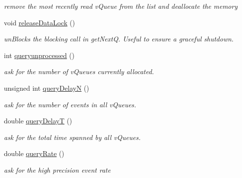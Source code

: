 \begin{DoxyCompactItemize}
\begin{DoxyCompactList}\small\item\em remove the most recently read v\+Queue from the list and deallocate the memory \end{DoxyCompactList}\item 
void \hyperlink{classev_1_1queueAllocator_aa3ab79f1da7f2930811ab980347b0305}{release\+Data\+Lock} ()\hypertarget{classev_1_1queueAllocator_aa3ab79f1da7f2930811ab980347b0305}{}\label{classev_1_1queueAllocator_aa3ab79f1da7f2930811ab980347b0305}

\begin{DoxyCompactList}\small\item\em un\+Blocks the blocking call in get\+NextQ. Useful to ensure a graceful shutdown. \end{DoxyCompactList}\item 
int \hyperlink{classev_1_1queueAllocator_adb785d0d33ba16522f8846da35c7ebab}{queryunprocessed} ()\hypertarget{classev_1_1queueAllocator_adb785d0d33ba16522f8846da35c7ebab}{}\label{classev_1_1queueAllocator_adb785d0d33ba16522f8846da35c7ebab}

\begin{DoxyCompactList}\small\item\em ask for the number of v\+Queues currently allocated. \end{DoxyCompactList}\item 
unsigned int \hyperlink{classev_1_1queueAllocator_a557861a4f3730b4d8da7895173c6986a}{query\+DelayN} ()\hypertarget{classev_1_1queueAllocator_a557861a4f3730b4d8da7895173c6986a}{}\label{classev_1_1queueAllocator_a557861a4f3730b4d8da7895173c6986a}

\begin{DoxyCompactList}\small\item\em ask for the number of events in all v\+Queues. \end{DoxyCompactList}\item 
double \hyperlink{classev_1_1queueAllocator_a439a2729d5474986977e26e63a9edf03}{query\+DelayT} ()\hypertarget{classev_1_1queueAllocator_a439a2729d5474986977e26e63a9edf03}{}\label{classev_1_1queueAllocator_a439a2729d5474986977e26e63a9edf03}

\begin{DoxyCompactList}\small\item\em ask for the total time spanned by all v\+Queues. \end{DoxyCompactList}\item 
double \hyperlink{classev_1_1queueAllocator_a39005a8e9337279debe435ae26c7d6fd}{query\+Rate} ()\hypertarget{classev_1_1queueAllocator_a39005a8e9337279debe435ae26c7d6fd}{}\label{classev_1_1queueAllocator_a39005a8e9337279debe435ae26c7d6fd}

\begin{DoxyCompactList}\small\item\em ask for the high precision event rate \end{DoxyCompactList}\end{DoxyCompactItemize}



